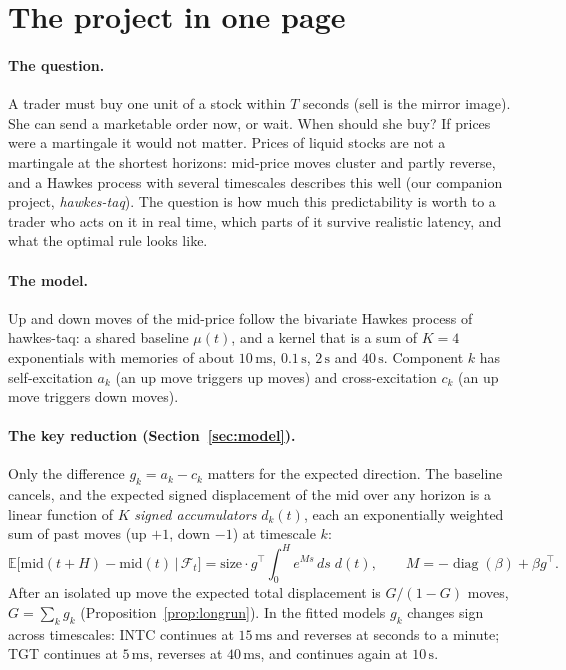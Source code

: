 \documentclass[11pt]{article}
\theoremstyle{definition}
\theoremstyle{remark}
\newcommand{\ms}{\,\text{ms}}
\newcommand{\sx}{\,\text{s}}
\newcommand{\E}{\mathbb{E}}
\begin{document}
\tableofcontents
\newpage

\section{The project in one page}
\label{sec:onepage}

\paragraph{The question.} A trader must buy one unit of a stock within $T$ seconds (sell is the mirror image). She can send a marketable order now, or wait. When should she buy? If prices were a martingale it would not matter. Prices of liquid stocks are not a martingale at the shortest horizons: mid-price moves cluster and partly reverse, and a Hawkes process with several timescales describes this well (our companion project, \emph{hawkes-taq}). The question is how much this predictability is worth to a trader who acts on it in real time, which parts of it survive realistic latency, and what the optimal rule looks like.

\paragraph{The model.} Up and down moves of the mid-price follow the bivariate Hawkes process of hawkes-taq: a shared baseline $\mu(t)$, and a kernel that is a sum of $K = 4$ exponentials with memories of about $10\ms$, $0.1\sx$, $2\sx$ and $40\sx$. Component $k$ has self-excitation $a_k$ (an up move triggers up moves) and cross-excitation $c_k$ (an up move triggers down moves).

\paragraph{The key reduction (Section~\ref{sec:model}).} Only the difference $g_k = a_k - c_k$ matters for the expected direction. The baseline cancels, and the expected signed displacement of the mid over any horizon is a linear function of $K$ \emph{signed accumulators} $d_k(t)$, each an exponentially weighted sum of past moves (up $+1$, down $-1$) at timescale $k$:
\[
\E\big[\text{mid}(t+H) - \text{mid}(t) \,\big|\, \mathcal F_t\big] = \text{size}\cdot g^\top\!\!\int_0^H\! e^{Ms}\,ds\; d(t), \qquad M = -\operatorname{diag}(\beta) + \beta g^\top .
\]
After an isolated up move the expected total displacement is $G/(1-G)$ moves, $G = \sum_k g_k$ (Proposition~\ref{prop:longrun}). In the fitted models $g_k$ changes sign across timescales: INTC continues at $15\ms$ and reverses at seconds to a minute; TGT continues at $5\ms$, reverses at $40\ms$, and continues again at $10\sx$.
\end{document}
